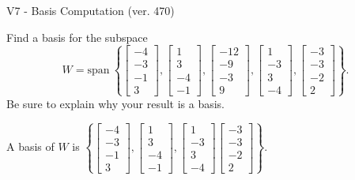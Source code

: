 \begin{exercise}
  \begin{exerciseTitle}V7 - Basis Computation (ver. 470)\end{exerciseTitle}
  \begin{exerciseStatement}
    Find a basis for the subspace 
\[W=\mathrm{span}\ \left\{\left[\begin{array}{r}
-4 \\
-3 \\
-1 \\
3
\end{array}\right] , \left[\begin{array}{r}
1 \\
3 \\
-4 \\
-1
\end{array}\right] , \left[\begin{array}{r}
-12 \\
-9 \\
-3 \\
9
\end{array}\right] , \left[\begin{array}{r}
1 \\
-3 \\
3 \\
-4
\end{array}\right] , \left[\begin{array}{r}
-3 \\
-3 \\
-2 \\
2
\end{array}\right]\right\}.\]
 Be sure to explain why your result is a basis.


  \end{exerciseStatement}
  \begin{exerciseAnswer}
   A basis of \(W\) is  \(\left\{\left[\begin{array}{r}
-4 \\
-3 \\
-1 \\
3
\end{array}\right] , \left[\begin{array}{r}
1 \\
3 \\
-4 \\
-1
\end{array}\right] , \left[\begin{array}{r}
1 \\
-3 \\
3 \\
-4
\end{array}\right] \left[\begin{array}{r}
-3 \\
-3 \\
-2 \\
2
\end{array}\right]\right\}\).
  


  \end{exerciseAnswer}
\end{exercise}